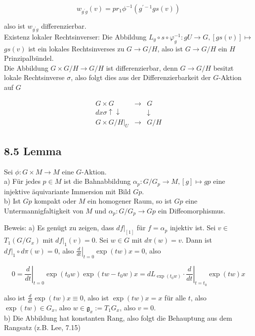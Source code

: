 \documentclass[10pt, letterpaper]{article}
\begin{document}
$$
w_{g^{\prime} g}(v)=p r_{1} \phi^{-1}\left(g^{\prime-1} g s(v)\right)
$$

also ist $w_{g^{\prime} g}$ differenzierbar.\\
Existenz lokaler Rechtsinverser: Die Abbildung $L_{g} \circ s \circ \varphi_{g}^{-1}: g U \rightarrow G,[g s(v)] \mapsto$ $g s(v)$ ist ein lokales Rechtsinverses zu $G \rightarrow G / H$, also ist $G \rightarrow G / H$ ein $H$ Prinzipalbündel.\\
Die Abbildung $G \times G / H \rightarrow G / H$ ist differenzierbar, denn $G \rightarrow G / H$ besitzt lokale Rechtsinverse $\sigma$, also folgt dies aus der Differenzierbarkeit der $G$-Aktion auf $G$

$$
\begin{array}{ccc}
G \times G & \longrightarrow & G \\
d x \sigma \uparrow \downarrow & & \downarrow \\
G \times G /\left.H\right|_{U} & \longrightarrow & G / H
\end{array}
$$

\subsection*{8.5 Lemma}
Sei $\phi: G \times M \rightarrow M$ eine $G$-Aktion.\\
a) Für jedes $p \in M$ ist die Bahnabbildung $\alpha_{p}: G / G_{p} \rightarrow M,[g] \mapsto g p$ eine injektive äquivariante Immersion mit Bild $G p$.\\
b) Ist $G p$ kompakt oder $M$ ein homogener Raum, so ist $G p$ eine Untermannigfaltigkeit von $M$ und $\alpha_{p}: G / G_{p} \rightarrow G p$ ein Diffeomorphismus.

Beweis: a) Es genügt zu zeigen, dass $\left.d f\right|_{[1]}$ für $f=\alpha_{p}$ injektiv ist. Sei $v \in$ $T_{1}\left(G / G_{x}\right)$ mit $\left.d f\right|_{1}(v)=0$. Sei $w \in G$ mit $d \pi(w)=v$. Dann ist $\left.d f\right|_{1} \circ d \pi(w)=0$, also $\left.\frac{d}{d t}\right|_{t=0} \exp (t w) x=0$, also

$$
0=\left.\frac{d}{d t}\right|_{t=0} \exp \left(t_{0} w\right) \exp \left(t w-t_{0} w\right) x=\left.d L_{\exp \left(t_{0} w\right)} \cdot \frac{d}{d t}\right|_{t=t_{0}} \exp (t w) x
$$

also ist $\frac{d}{d t} \exp (t w) x \equiv 0$, also ist $\exp (t w) x=x$ für alle $t$, also $\exp (t w) \in G_{x}$, also $w \in \mathfrak{g}_{x}:=T_{1} G_{x}$, also $v=0$.\\
b) Die Abbildung hat konstanten Rang, also folgt die Behauptung aus dem Rangsatz (z.B. Lee, 7.15)
\end{document}

